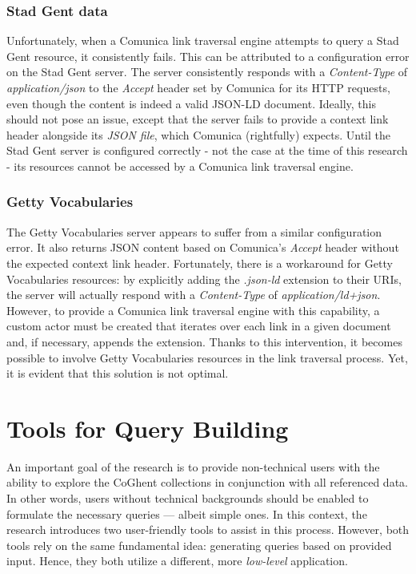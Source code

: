 \documentclass[conference]{IEEEtran}
\begin{document}
\subsubsection{Stad Gent data}
Unfortunately, when a Comunica link traversal engine attempts to query a Stad Gent resource, it consistently fails. This can be attributed to a configuration error on the Stad Gent server. The server consistently responds with a \textit{Content-Type} of \textit{application/json} to the \textit{Accept} header set by Comunica for its HTTP requests, even though the content is indeed a valid JSON-LD document. Ideally, this should not pose an issue, except that the server fails to provide a context link header alongside its \textit{JSON file}, which Comunica (rightfully) expects. Until the Stad Gent server is configured correctly - not the case at the time of this research - its resources cannot be accessed by a Comunica link traversal engine.

\subsubsection{Getty Vocabularies}
The Getty Vocabularies server appears to suffer from a similar configuration error. It also returns JSON content based on Comunica's \textit{Accept} header without the expected context link header. Fortunately, there is a workaround for Getty Vocabularies resources: by explicitly adding the \textit{.json-ld} extension to their URIs, the server will actually respond with a \textit{Content-Type} of \textit{application/ld+json}. However, to provide a Comunica link traversal engine with this capability, a custom actor must be created that iterates over each link in a given document and, if necessary, appends the extension. Thanks to this intervention, it becomes possible to involve Getty Vocabularies resources in the link traversal process. Yet, it is evident that this solution is not optimal.

\section{Tools for Query Building}
An important goal of the research is to provide non-technical users with the ability to explore the CoGhent collections in conjunction with all referenced data. In other words, users without technical backgrounds should be enabled to formulate the necessary queries — albeit simple ones. In this context, the research introduces two user-friendly tools to assist in this process. However, both tools rely on the same fundamental idea: generating queries based on provided input. Hence, they both utilize a different, more \textit{low-level} application.
\end{document}
